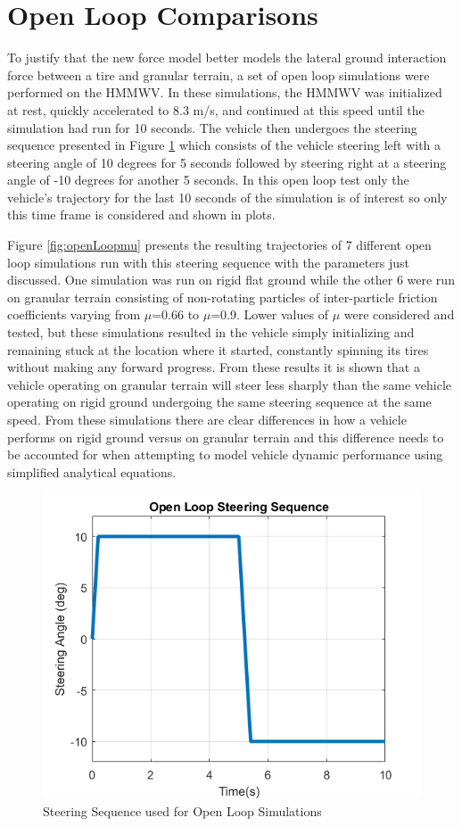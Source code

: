 \documentclass[12pt,onecolumn]{report}
\begin{document}
\section{Open Loop Comparisons}\label{s:OpenLoop}

To justify that the new force model better models the lateral ground interaction force between a tire and granular terrain, a set of open loop simulations were performed on the HMMWV. In these simulations, the HMMWV was initialized at rest, quickly accelerated to 8.3 m/s, and continued at this speed until the simulation had run for 10 seconds. The vehicle then undergoes the steering sequence presented in Figure \ref{fig:openSteer} which consists of the vehicle steering left with a steering angle of 10 degrees for 5 seconds followed by steering right at a steering angle of -10 degrees for another 5 seconds. In this open loop test only the vehicle's trajectory for the last 10 seconds of the simulation is of interest so only this time frame is considered and shown in plots.

Figure \ref{fig:openLoopmu} presents the resulting trajectories of 7 different open loop simulations run with this steering sequence with the parameters just discussed. One simulation was run on rigid flat ground while the other 6 were run on granular terrain consisting of non-rotating particles of inter-particle friction coefficients varying from $\mu$=0.66 to $\mu$=0.9. Lower values of $\mu$ were considered and tested, but these simulations resulted in the vehicle simply initializing and remaining stuck at the location where it started, constantly spinning its tires without making any forward progress. From these results it is shown that a vehicle operating on granular terrain will steer less sharply than the same vehicle operating on rigid ground undergoing the same steering sequence at the same speed. From these simulations there are clear differences in how a vehicle performs on rigid ground versus on granular terrain and this difference needs to be accounted for when attempting to model vehicle dynamic performance using simplified analytical equations. 

\begin{figure}
	\centering
	\includegraphics[width=0.8\columnwidth]{Figs/openLoopSteer.png}
	\caption{\small Steering Sequence used for Open Loop Simulations}  
	\label{fig:openSteer}
\end{figure}
\end{document}
